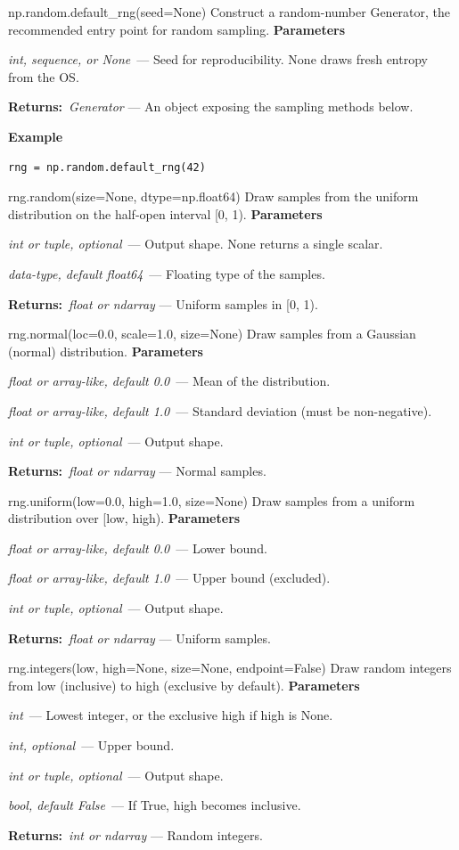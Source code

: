 \documentclass[10pt]{article}
\newenvironment{params}
  {\smallskip\textbf{\small\color{accent}Parameters}\par\nopagebreak
   \begin{description}[leftmargin=1.3em,itemsep=1.5pt,parsep=0pt,topsep=1pt,
      labelindent=0pt,style=sameline,font=\normalfont]}
  {\end{description}}
\newcommand{\pitem}[3]{\item[{\ttfamily\color{accent}#1}]{\itshape #2}\ --- #3}
\newcommand{\preturn}[2]{\smallskip\textbf{\small\color{accent}Returns:}\ {\itshape #1} --- #2\par}
\begin{document}
\begin{func}{np.random.default\_rng(seed=None)}
Construct a random-number Generator, the recommended entry point for random sampling.
\begin{params}
\pitem{seed}{int, sequence, or None}{Seed for reproducibility. None draws fresh entropy from the OS.}
\end{params}
\preturn{Generator}{An object exposing the sampling methods below.}
\smallskip\textbf{\small\color{accent}Example}
\begin{lstlisting}[style=py]
rng = np.random.default_rng(42)
\end{lstlisting}
\end{func}
\medskip

\begin{func}{rng.random(size=None, dtype=np.float64)}
Draw samples from the uniform distribution on the half-open interval [0, 1).
\begin{params}
\pitem{size}{int or tuple, optional}{Output shape. None returns a single scalar.}
\pitem{dtype}{data-type, default float64}{Floating type of the samples.}
\end{params}
\preturn{float or ndarray}{Uniform samples in [0, 1).}
\end{func}
\medskip

\begin{func}{rng.normal(loc=0.0, scale=1.0, size=None)}
Draw samples from a Gaussian (normal) distribution.
\begin{params}
\pitem{loc}{float or array-like, default 0.0}{Mean of the distribution.}
\pitem{scale}{float or array-like, default 1.0}{Standard deviation (must be non-negative).}
\pitem{size}{int or tuple, optional}{Output shape.}
\end{params}
\preturn{float or ndarray}{Normal samples.}
\end{func}
\medskip

\begin{func}{rng.uniform(low=0.0, high=1.0, size=None)}
Draw samples from a uniform distribution over [low, high).
\begin{params}
\pitem{low}{float or array-like, default 0.0}{Lower bound.}
\pitem{high}{float or array-like, default 1.0}{Upper bound (excluded).}
\pitem{size}{int or tuple, optional}{Output shape.}
\end{params}
\preturn{float or ndarray}{Uniform samples.}
\end{func}
\medskip

\begin{func}{rng.integers(low, high=None, size=None, endpoint=False)}
Draw random integers from low (inclusive) to high (exclusive by default).
\begin{params}
\pitem{low}{int}{Lowest integer, or the exclusive high if high is None.}
\pitem{high}{int, optional}{Upper bound.}
\pitem{size}{int or tuple, optional}{Output shape.}
\pitem{endpoint}{bool, default False}{If True, high becomes inclusive.}
\end{params}
\preturn{int or ndarray}{Random integers.}
\end{func}
\medskip
\end{document}
